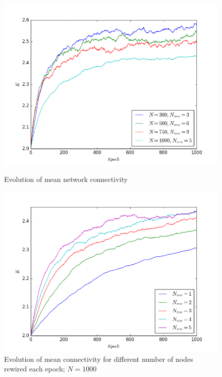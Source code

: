 \documentclass[procedia]{easychair}
\begin{document}
	\begin{figure}[ht!]
		\begin{minipage}[t]{0.45\textwidth}
			\includegraphics[width=1.0\textwidth]{plots/evolution}
			\caption{Evolution of mean network connectivity}
		\end{minipage}\hfill
		\begin{minipage}[t]{0.45\textwidth}
			\includegraphics[width=1.0\textwidth]{plots/n_rew}
			\caption{Evolution of mean connectivity for different number of nodes rewired each epoch; $N=1000$}
		\end{minipage}
	\end{figure}
	
\end{document}

